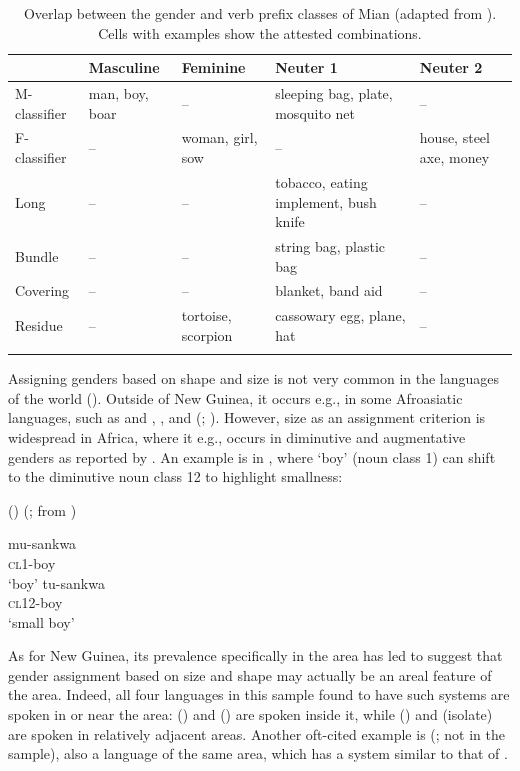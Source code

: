 \documentclass[output=collectionpaper]{langsci/langscibook}
\begin{document}
\begin{table}[htb]
\small
\begin{tabularx}{\textwidth}{lQQQQ}
\lsptoprule
  & Masculine & Feminine & Neuter 1 & Neuter 2 \\
\midrule
M-classifier & man, boy, boar & -- & sleeping bag, plate, mosquito net & -- \\
F-classifier & -- & woman, girl, sow & -- & house, steel axe, money \\
Long & -- & -- & tobacco, eating implement, bush knife & -- \\
Bundle & -- & -- & string bag, plastic bag & -- \\
Covering & -- & -- & blanket, band aid & -- \\
Residue & -- & tortoise, scorpion & cassowary egg, plane, hat & -- \\
\lspbottomrule
\end{tabularx}
\caption{Overlap between the gender and verb prefix classes of Mian (adapted from \citealt[34]{Fedden2017}). Cells with examples show the attested combinations.}
\label{tab:Svard:NEW}
\end{table}


Assigning genders based on shape and size is not very common in the languages of the world (\citealt[chap.~11]{Aikhenvald2000}). Outside of New Guinea, it occurs e.g., in some Afroasiatic languages, such as  and , , and  (\citealt[277]{Aikhenvald2000}; \citealt[191]{Heine1982}). However, size as an assignment criterion is widespread in Africa, where it e.g., occurs in diminutive and augmentative genders as reported by \citet{DiGarbo2014}. An example is in , where `boy' (noun class 1) can shift to the diminutive noun class 12 to highlight smallness:


\ea
{} () (\citealt[147]{DiGarbo2014}; from \citealt[21]{Carter2002})\\
\begin{xlist}
\ex
\gll mu-sankwa\\
     \textsc{cl1-}boy\\
\glt `boy'
\ex
\gll tu-sankwa\\
     \textsc{cl12-}boy\\
\glt `small boy'
\end{xlist}
\z


As for New Guinea, its prevalence specifically in the  area has led \citet[113]{Aikhenvald2008} to suggest that gender assignment based on size and shape may actually be an areal feature of the  area. Indeed, all four languages in this sample found to have such systems are spoken in or near the  area:  () and  () are spoken inside it, while  () and  (isolate) are spoken in relatively adjacent areas. Another oft-cited example is  (\citealt{Bruce1984}; not in the sample), also a  language of the same area, which has a system similar to that of  \citep[112]{Aikhenvald2008}.
\end{document}
